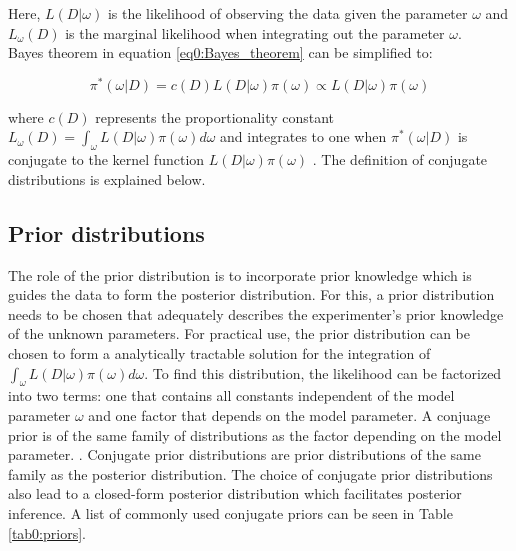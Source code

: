 Here, $L(D|\omega)$ is the likelihood of observing the data given the parameter $\omega$ and $L_\omega(D)$ is the marginal likelihood when integrating out the parameter $\omega$.\\

Bayes theorem in equation \ref{eq0:Bayes_theorem} can be simplified to:

\begin{equation}
\pi^*(\omega|D)=c(D)L(D|\omega)\pi(\omega)\propto{}L(D|\omega)\pi(\omega)
\end{equation} 

where $c(D)$ represents the proportionality constant $L_\omega(D)=\int_\omega{}L(D|\omega)\pi(\omega)d\omega$ and integrates to one when $\pi^*(\omega|D)$ is conjugate to the kernel function $L(D|\omega)\pi(\omega)$ \citep{Bernardo2003, Raiffa1961}. The definition of conjugate distributions is explained below.  

\subsection{Prior distributions}

The role of the prior distribution is to incorporate prior knowledge which is guides the data to form the posterior distribution. For this, a prior distribution needs to be chosen that adequately describes the experimenter's prior knowledge of the unknown parameters. For practical use, the prior distribution can be chosen to form a analytically tractable solution for the integration of $\int_\omega{}L(D|\omega)\pi(\omega)d\omega$. To find this distribution, the likelihood can be factorized into two terms: one that contains all constants independent of the model parameter $\omega$ and one factor that depends on the model parameter. A conjuage prior is of the same family of distributions as the factor depending on the model parameter. \citep{Fink1997}. Conjugate prior distributions are prior distributions of the same family as the posterior distribution. The choice of conjugate prior distributions also lead to a closed-form posterior distribution which facilitates posterior inference. A list of commonly used conjugate priors can be seen in Table \ref{tab0:priors}.

